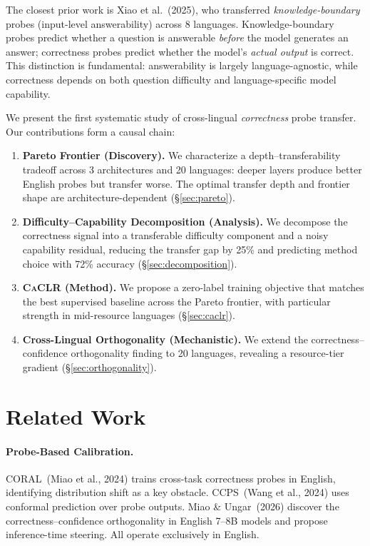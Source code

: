 \documentclass[11pt,a4paper]{article}
\newcommand{\caclr}{\textsc{CaCLR}}
\begin{document}
The closest prior work is Xiao et al.~(2025), who transferred \emph{knowledge-boundary} probes (input-level answerability) across 8 languages.
Knowledge-boundary probes predict whether a question is answerable \emph{before} the model generates an answer; correctness probes predict whether the model's \emph{actual output} is correct.
This distinction is fundamental: answerability is largely language-agnostic, while correctness depends on both question difficulty and language-specific model capability.

We present the first systematic study of cross-lingual \emph{correctness} probe transfer.
Our contributions form a causal chain:

\begin{enumerate}[nosep,leftmargin=*]
\item \textbf{Pareto Frontier (Discovery).} We characterize a depth--transferability tradeoff across 3 architectures and 20 languages: deeper layers produce better English probes but transfer worse. The optimal transfer depth and frontier shape are architecture-dependent (\S\ref{sec:pareto}).

\item \textbf{Difficulty--Capability Decomposition (Analysis).} We decompose the correctness signal into a transferable difficulty component and a noisy capability residual, reducing the transfer gap by 25\% and predicting method choice with 72\% accuracy (\S\ref{sec:decomposition}).

\item \textbf{\caclr{} (Method).} We propose a zero-label training objective that matches the best supervised baseline across the Pareto frontier, with particular strength in mid-resource languages (\S\ref{sec:caclr}).

\item \textbf{Cross-Lingual Orthogonality (Mechanistic).} We extend the correctness--confidence orthogonality finding to 20 languages, revealing a resource-tier gradient (\S\ref{sec:orthogonality}).
\end{enumerate}

\section{Related Work}

\paragraph{Probe-Based Calibration.}
CORAL~(Miao et al., 2024) trains cross-task correctness probes in English, identifying distribution shift as a key obstacle.
CCPS~(Wang et al., 2024) uses conformal prediction over probe outputs.
Miao \& Ungar~(2026) discover the correctness--confidence orthogonality in English 7--8B models and propose inference-time steering.
All operate exclusively in English.
\end{document}
